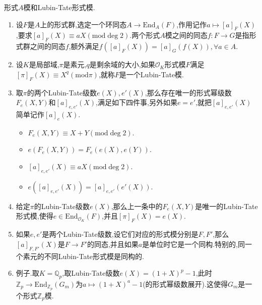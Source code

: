 形式$A$模和Lubin-Tate形式模.
\begin{enumerate}
	\item 设$F$是$A$上的形式群,选定一个环同态$A\to\mathrm{End}_A(F)$,作用记作$a\mapsto[a]_F(X)$,要求$[a]_F(X)\equiv aX(\mathrm{mod}\deg2)$.两个形式$A$模之间的同态$f:F\to G$是指形式群之间的同态$f$,额外满足$f([a]_F(X))=[a]_G(f(X)),\forall a\in A$.
	\item 设$K$是局部域,$\pi$是素元,$q$是剩余域的大小,如果$\mathscr{O}_K$形式模$F$满足$[\pi]_F(X)\equiv X^q(\mathrm{mod}\pi)$,就称$F$是一个Lubin-Tate模.
	\item 取$\pi$的两个Lubin-Tate级数$e(X),e'(X)$,那么存在唯一的形式幂级数$F_e(X,Y)$和$[a]_{e,e'}(X)$,满足如下四件事,另外如果$e=e'$,就把$[a]_{e,e'}(X)$简单记作$[a]_e(X)$.
	\begin{itemize}
		\item $F_e(X,Y)\equiv X+Y(\mathrm{mod}\deg2)$.
		\item $e(F_e(X,Y))=F_e(e(X),e(Y))$.
		\item $[a]_{e,e'}(X)\equiv aX(\mathrm{mod}\deg2)$.
		\item $e([a]_{e,e'}(X))=[a]_{e,e'}(e'(X))$.
	\end{itemize}
    \item 给定$\pi$的Lubin-Tate级数$e(X)$,那么上一条中的$F_e(X,Y)$是唯一的Lubin-Tate形式模,使得$e\in\mathrm{End}_{\mathscr{O}_K}(F)$,并且$[\pi]_F(X)=e(X)$.
    \item 如果$e,e'$是两个Lubin-Tate级数,设它们对应的形式模分别是$F,F'$,那么$[a]_{F,F'}(X)$是$F\to F'$的同态,并且如果$a$是单位时它是一个同构.特别的,同一个素元的不同Lubin-Tate形式模是同构的.
    \item 例子.取$K=\mathbb{Q}_p$,取Lubin-Tate级数$e(X)=(1+X)^p-1$,此时$\mathbb{Z}_p\to\mathrm{End}_{\mathbb{Z}_p}(G_m)$为$a\mapsto (1+X)^a-1$(的形式幂级数展开).这使得$G_m$是一个形式$\mathbb{Z}_p$模.
\end{enumerate}

